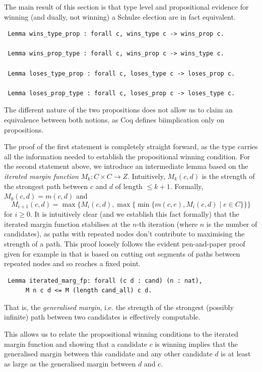 \noindent
The main result of this section is that type level and propositional
evidence for winning (and dually, not winning) a Schulze election
are in fact equivalent.

\begin{verbatim}
 Lemma wins_type_prop : forall c, wins_type c -> wins_prop c.

 Lemma wins_prop_type : forall c, wins_prop c -> wins_type c.
 
 Lemma loses_type_prop : forall c, loses_type c -> loses_prop c.
 
 Lemma loses_prop_type : forall c, loses_prop c -> loses_type c.
\end{verbatim}

\noindent
The different nature of the two propositions does not allow
us to claim an equivalence between both notions, as Coq defines
biimplication only on propositions.

The proof of the first statement is completely straight forward, as
the type carries all the information needed to establish the
propositional winning condition. For the second statement above, we
introduce an intermediate lemma based on the \emph{iterated margin
function}
$M_k: C \times C \to Z$. Intuitively, $M_k (c, d)$ is the
strength of the strongest path between $c$ and $d$ of length $\leq
k+1$. Formally,
$M_0 (c, d) = m(c, d)$ and
\[ M_{i+1}(c, d) = \max \lbrace M_i(c, d), \max \lbrace  \min
\lbrace m(c, e), M_i(e, d) \mid e \in C \rbrace \rbrace \rbrace
\] for $i \geq 0$.
%
It is intuitively clear (and we establish this fact formally) that
the iterated margin function stabilises at the $n$-th iteration
(where $n$ is the number of candidates), as paths with repeated
nodes don't contribute to maximising the strength of a path. This
proof loosely follows the evident pen-and-paper proof given for
example in
\citep{Carre:1971:ANR} that is based on cutting out segments of paths
between repeated nodes and so reaches a fixed point.

\begin{verbatim}
 Lemma iterated_marg_fp: forall (c d : cand) (n : nat),
      M n c d <= M (length cand_all) c d.
\end{verbatim}

\noindent
That is, the \emph{generalised margin}, i.e. the strength of the strongest (possibly infinite) path
between two candidates is
effectively computable.

This allows us to relate the propositional winning conditions to the
iterated margin function and showing that a candidate $c$ is winning
implies that the generalised margin between this candidate and any
other candidate $d$ is at least as large as the generalised margin between $d$
and $c$.

